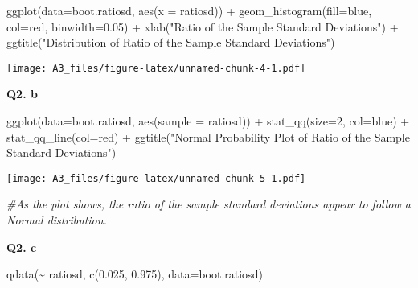 \documentclass[
]{article}
\newenvironment{Shaded}{\begin{snugshade}}{\end{snugshade}}
\newcommand{\AttributeTok}[1]{\textcolor[rgb]{0.77,0.63,0.00}{#1}}
\newcommand{\CommentTok}[1]{\textcolor[rgb]{0.56,0.35,0.01}{\textit{#1}}}
\newcommand{\DecValTok}[1]{\textcolor[rgb]{0.00,0.00,0.81}{#1}}
\newcommand{\FloatTok}[1]{\textcolor[rgb]{0.00,0.00,0.81}{#1}}
\newcommand{\FunctionTok}[1]{\textcolor[rgb]{0.00,0.00,0.00}{#1}}
\newcommand{\NormalTok}[1]{#1}
\newcommand{\SpecialCharTok}[1]{\textcolor[rgb]{0.00,0.00,0.00}{#1}}
\newcommand{\StringTok}[1]{\textcolor[rgb]{0.31,0.60,0.02}{#1}}
\begin{document}
\begin{Shaded}
\begin{Highlighting}[]
\FunctionTok{ggplot}\NormalTok{(}\AttributeTok{data=}\NormalTok{boot.ratiosd, }\FunctionTok{aes}\NormalTok{(}\AttributeTok{x =}\NormalTok{ ratiosd)) }\SpecialCharTok{+} \FunctionTok{geom\_histogram}\NormalTok{(}\AttributeTok{fill=}\StringTok{\textquotesingle{}blue\textquotesingle{}}\NormalTok{, }\AttributeTok{col=}\StringTok{\textquotesingle{}red\textquotesingle{}}\NormalTok{, }\AttributeTok{binwidth=}\FloatTok{0.05}\NormalTok{) }\SpecialCharTok{+} \FunctionTok{xlab}\NormalTok{(}\StringTok{"Ratio of the Sample Standard Deviations"}\NormalTok{) }\SpecialCharTok{+} \FunctionTok{ggtitle}\NormalTok{(}\StringTok{"Distribution of Ratio of the Sample Standard Deviations"}\NormalTok{)}
\end{Highlighting}
\end{Shaded}

\texttt{[image: A3\_files/figure-latex/unnamed-chunk-4-1.pdf]}

\textbf{Q2. b}

\begin{Shaded}
\begin{Highlighting}[]
\FunctionTok{ggplot}\NormalTok{(}\AttributeTok{data=}\NormalTok{boot.ratiosd, }\FunctionTok{aes}\NormalTok{(}\AttributeTok{sample =}\NormalTok{ ratiosd)) }\SpecialCharTok{+} \FunctionTok{stat\_qq}\NormalTok{(}\AttributeTok{size=}\DecValTok{2}\NormalTok{, }\AttributeTok{col=}\StringTok{\textquotesingle{}blue\textquotesingle{}}\NormalTok{) }\SpecialCharTok{+} \FunctionTok{stat\_qq\_line}\NormalTok{(}\AttributeTok{col=}\StringTok{\textquotesingle{}red\textquotesingle{}}\NormalTok{) }\SpecialCharTok{+} \FunctionTok{ggtitle}\NormalTok{(}\StringTok{"Normal Probability Plot of Ratio of the Sample Standard Deviations"}\NormalTok{)}
\end{Highlighting}
\end{Shaded}

\texttt{[image: A3\_files/figure-latex/unnamed-chunk-5-1.pdf]}

\begin{Shaded}
\begin{Highlighting}[]
\CommentTok{\#As the plot shows, the ratio of the sample standard deviations appear to follow a Normal distribution.}
\end{Highlighting}
\end{Shaded}

\textbf{Q2. c}

\begin{Shaded}
\begin{Highlighting}[]
\FunctionTok{qdata}\NormalTok{(}\SpecialCharTok{\textasciitilde{}}\NormalTok{ ratiosd, }\FunctionTok{c}\NormalTok{(}\FloatTok{0.025}\NormalTok{, }\FloatTok{0.975}\NormalTok{), }\AttributeTok{data=}\NormalTok{boot.ratiosd) }
\end{Highlighting}
\end{Shaded}
\end{document}
